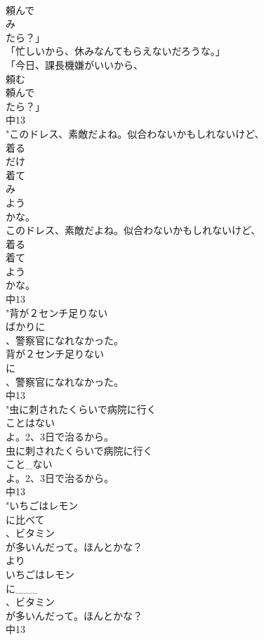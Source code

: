 \documentclass[8pt]{extreport}
\begin{document}
\begin{CJK}{UTF8}{min}
\\	頼んで
\\	み
\\	たら？」
\\	「忙しいから、休みなんてもらえないだろうな。」
\\	「今日、課長機嫌がいいから、
\\	頼む
\\	頼んで
\\	たら？」
\\	中13
\\	"このドレス、素敵だよね。似合わないかもしれないけど、
\\	着る
\\	だけ
\\	着て
\\	み
\\	よう
\\	かな。
\\	このドレス、素敵だよね。似合わないかもしれないけど、
\\	着る
\\	着て
\\	よう
\\	かな。
\\	中13
\\	"背が２センチ足りない
\\	ばかりに
\\	、警察官になれなかった。
\\	背が２センチ足りない
\\	に
\\	、警察官になれなかった。
\\	中13
\\	"虫に刺されたくらいで病院に行く
\\	ことはない
\\	よ。2、3日で治るから。
\\	虫に刺されたくらいで病院に行く
\\	こと_ない
\\	よ。2、3日で治るから。
\\	中13
\\	"いちごはレモン
\\	に比べて
\\	、ビタミン
\\	が多いんだって。ほんとかな？
\\	より	
\\	いちごはレモン
\\	に___
\\	、ビタミン
\\	が多いんだって。ほんとかな？
\\	中13

\end{CJK}
\end{document}
